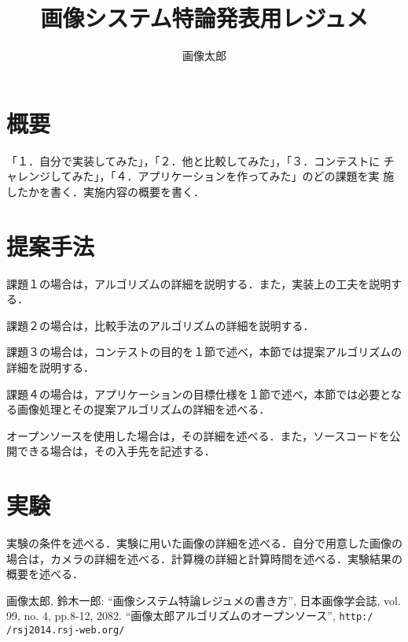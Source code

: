 \documentclass{jsarticle}
\begin{document}
\title{画像システム特論発表用レジュメ}
\author{画像太郎}

\setlength{\baselineskip}{4.4mm}
\maketitle
\thispagestyle{empty}
\pagestyle{empty}

\section{概要}

「１．自分で実装してみた」，「２．他と比較してみた」，「３．コンテストに
チャレンジしてみた」，「４．アプリケーションを作ってみた」のどの課題を実
施したかを書く．実施内容の概要を書く．


\section{提案手法}

課題１の場合は，アルゴリズムの詳細を説明する．また，実装上の工夫を説明す
る．

課題２の場合は，比較手法のアルゴリズムの詳細を説明する．

課題３の場合は，コンテストの目的を１節で述べ，本節では提案アルゴリズムの
詳細を説明する．

課題４の場合は，アプリケーションの目標仕様を１節で述べ，本節では必要とな
る画像処理とその提案アルゴリズムの詳細を述べる．

オープンソースを使用した場合は，その詳細を述べる．また，ソースコードを公
開できる場合は，その入手先を記述する．


\section{実験}

実験の条件を述べる．実験に用いた画像の詳細を述べる．自分で用意した画像の
場合は，カメラの詳細を述べる．計算機の詳細と計算時間を述べる．実験結果の
概要を述べる．


\small
\begin{thebibliography}{10}

画像太郎, 鈴木一郎:
``画像システム特論レジュメの書き方'', 
日本画像学会誌, vol. 99, no. 4, pp.8-12, 2082.
``画像太郎アルゴリズムのオープンソース'', 
{\tt http:/ /rsj2014.rsj-web.org/}

\end{thebibliography}
\normalsize
\end{document}
